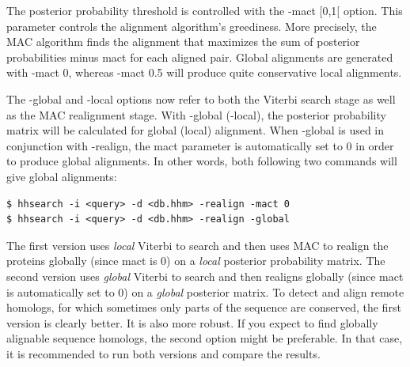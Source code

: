 \documentclass[11pt,a4paper]{article}
\begin{document}
The posterior probability threshold is controlled with the -mact [0,1[ option. 
This parameter controls the alignment algorithm's greediness. More precisely, the 
MAC algorithm finds the alignment that maximizes the sum of posterior probabilities 
minus mact for each aligned pair. Global alignments are generated with -mact 0, 
whereas -mact 0.5 will produce quite conservative local alignments. 

The -global and -local options now refer to both the Viterbi search stage as 
well as the MAC realignment stage. With -global (-local), the posterior probability 
matrix will be calculated for global (local) alignment. When -global is used in 
conjunction with -realign, the mact parameter is automatically set to 0 in order to 
produce global alignments. In other words, both following two commands will give 
global alignments:
\begin{verbatim}
$ hhsearch -i <query> -d <db.hhm> -realign -mact 0
$ hhsearch -i <query> -d <db.hhm> -realign -global
\end{verbatim}

The first version uses \emph{local} Viterbi to search and then uses MAC to realign the 
proteins globally (since mact is 0) on a \emph{local} posterior probability matrix. The 
second version uses \emph{global} Viterbi to search and then realigns globally (since mact 
is automatically set to 0) on a \emph{global} posterior matrix. To detect and align remote 
homologs, for which sometimes only parts of the sequence are conserved, the first 
version is clearly better. It is also more robust. If you expect to find globally 
alignable sequence homologs, the second option might be preferable. In that case, 
it is recommended to run both versions and compare the results. 
\end{document}
